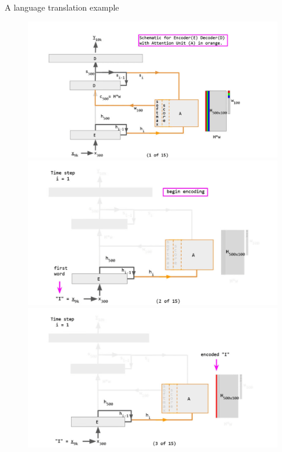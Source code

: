 \documentclass[
  notheorems,
  aspectratio=54,
]{beamer}
\begin{document}
\begin{frame}{A language translation example}
\begin{figure}
  \begin{minipage}[b]{0.4\textwidth}
    \par\medskip
    \includegraphics[width=1.3\textwidth]{./translation/1.png}
  \end{minipage}
  \hfill
  \begin{minipage}[b]{0.4\textwidth}
    \par\medskip
    \includegraphics[width=1.3\textwidth]{./translation/2.jpg}
  \end{minipage}
  \begin{minipage}[b]{0.4\textwidth}
    \par\medskip
    \includegraphics[width=1.3\textwidth]{./translation/3.jpg}
  \end{minipage}
\end{figure}
\end{frame}
\end{document}
